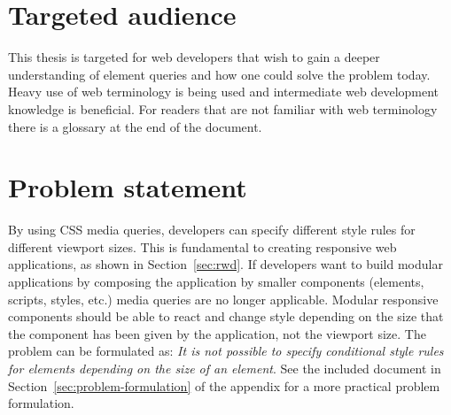 \documentclass[a4paper,11pt]{kth-mag}
\begin{document}
    \section{Targeted audience}
      This thesis is targeted for \gls{web} developers that wish to gain a deeper understanding of element queries and how one could solve the problem today.
      Heavy use of \gls{web} terminology is being used and intermediate \gls{web} development knowledge is beneficial.
      For readers that are not familiar with web terminology there is a glossary at the end of the document.
    \section{Problem statement}\label{sec:problem}
      By using \gls{CSS} \gls{media queries}, developers can specify different style rules for different \gls{viewport} sizes.
      This is fundamental to creating \gls{responsive} \gls{web} applications, as shown in Section~\ref{sec:rwd}.
      If developers want to build modular applications by composing the application by smaller components (\glspl{element}, scripts, styles, etc.) \gls{media queries} are no longer applicable.
      Modular \gls{responsive} components should be able to react and change style depending on the size that the component has been given by the application, not the \gls{viewport} size. 
      The problem can be formulated as: \emph{It is not possible to specify conditional style rules for \glspl{element} depending on the size of an element}.
      See the included document in Section~\ref{sec:problem-formulation} of the appendix for a more practical problem formulation.
\end{document}
